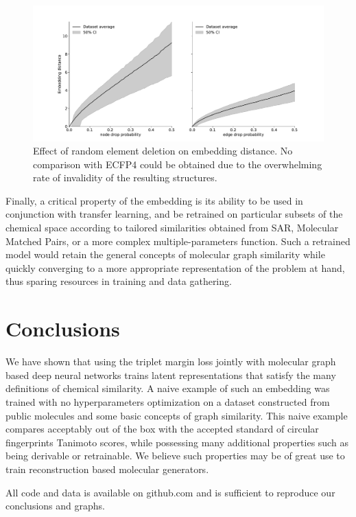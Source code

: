 \documentclass[journal=jacsat,manuscript=article]{achemso}
\begin{document}
\begin{figure}[hbtp]
\centering
\includegraphics[width=\textwidth]{data/Ablations.pdf}
\caption{Effect of random element deletion on embedding distance. No comparison with ECFP4 could be obtained due to the overwhelming rate of invalidity of the resulting structures.}
\label{fig:Ablations}
\end{figure}

Finally, a critical property of the embedding is its ability to be used in conjunction with transfer learning\cite{tan2018survey, weiss2016survey}, and be retrained on particular subsets of the chemical space according to tailored similarities obtained from SAR, Molecular Matched Pairs\cite{griffen2011matched}, or a more complex multiple-parameters function. Such a retrained model would retain the general concepts of molecular graph similarity while quickly converging to a more appropriate representation of the problem at hand, thus sparing resources in training and data gathering.

\section{Conclusions}\label{conclusions}
We have shown that using the triplet margin loss jointly with molecular graph based deep neural networks trains latent representations that satisfy the many definitions of chemical similarity. A naive example of such an embedding was trained with no hyperparameters optimization on a dataset constructed from public molecules and some basic concepts of graph similarity. This naive example compares acceptably out of the box with the accepted standard of circular fingerprints Tanimoto scores, while possessing many additional properties such as being derivable or retrainable. We believe such properties may be of great use to train reconstruction based molecular generators. 

All code and data is available on github.com and is sufficient to reproduce our conclusions and graphs.
\end{document}
